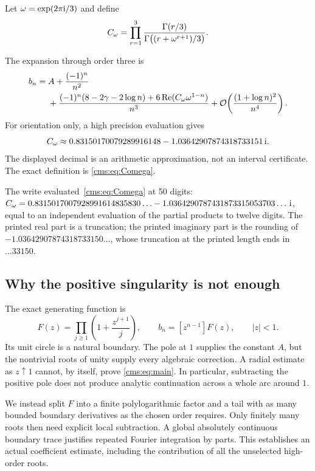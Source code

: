 Let $\omega=\exp(2\pi\mathrm i/3)$ and define
\begin{equation}\label{cms:eq:Comega}
C_\omega=\prod_{r=1}^{3}
\frac{\Gamma(r/3)}{\Gamma\bigl((r+\omega^{r+1})/3\bigr)}.
\end{equation}
\begin{theorem}\label{cms:thm:explicit}
The expansion through order three is
\begin{align}\label{cms:eq:explicit}
b_n={}&A+\frac{(-1)^n}{n^2}\\
&+\frac{(-1)^n(8-2\gamma-2\log n)
 +6\operatorname{Re}(C_\omega\omega^{1-n})}{n^3}
 +\mathcal O\!\left(\frac{(1+\log n)^2}{n^4}\right).\notag
\end{align}
For orientation only, a high precision evaluation gives
\[
C_\omega\approx0.83150170079289916148
      -1.03642907874318733151\,\mathrm i.
\]
The displayed decimal is an arithmetic approximation, not an interval certificate. The exact definition is \eqref{cms:eq:Comega}.
\end{theorem}
\begin{writenote}
The write evaluated~\eqref{cms:eq:Comega} at 50 digits:
$C_\omega=0.8315017007928991614835830\ldots-1.0364290787431873315053703\ldots\,\mathrm i$,
equal to an independent evaluation of the partial products to twelve digits.
The printed real part is a truncation; the printed imaginary part is the
rounding of $-1.03642907874318733150\ldots$, whose truncation at the printed
length ends in $\ldots33150$.
\end{writenote}

\subsection{Why the positive singularity is not enough}
The exact generating function is
\begin{equation}\label{cms:eq:Fintro}
F(z)=\prod_{j\geq1}\left(1+\frac{z^{j+1}}j\right),\qquad
b_n=[z^{n-1}]F(z),\qquad |z|<1.
\end{equation}
Its unit circle is a natural boundary. The pole at $1$ supplies the constant $A$, but the nontrivial roots of unity supply every algebraic correction. A radial estimate as $z\uparrow1$ cannot, by itself, prove \eqref{cms:eq:main}. In particular, subtracting the positive pole does not produce analytic continuation across a whole arc around $1$.

We instead split $F$ into a finite polylogarithmic factor and a tail with as many bounded boundary derivatives as the chosen order requires. Only finitely many roots then need explicit local subtraction. A global absolutely continuous boundary trace justifies repeated Fourier integration by parts. This establishes an actual coefficient estimate, including the contribution of all the unselected high-order roots.

